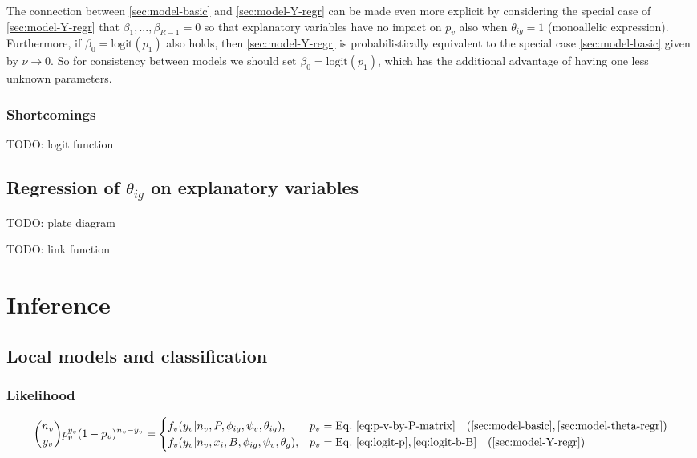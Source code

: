 \documentclass[letterpaper]{article}
\begin{document}
The connection between \ref{sec:model-basic} and \ref{sec:model-Y-regr} can be
made even more explicit by considering the special case of
\ref{sec:model-Y-regr} that \(\beta_1,...,\beta_{R-1}=0\) so that explanatory
variables have no impact on \(p_v\) also when \(\theta_{ig}=1\) (monoallelic
expression).  Furthermore, if \(\beta_0=\mathrm{logit}(p_1)\) also holds, then
\ref{sec:model-Y-regr} is probabilistically equivalent to the special case
\ref{sec:model-basic} given by \(\nu\rightarrow 0\).  So for consistency
between models we should set \(\beta_0=\mathrm{logit}(p_1)\), which has the
additional advantage of having one less unknown parameters.

\subsubsection{Shortcomings}

TODO: logit function

\subsection{Regression of \(\theta_{ig}\) on explanatory variables }
\label{sec:model-theta-regr}

TODO: plate diagram

TODO: link function

\renewcommand{\thesubsection}{\arabic{section}.\arabic{subsection}}
\section{Inference}
\label{sec:likelihood}

\subsection{Local models and classification}

\subsubsection{Likelihood}

\begin{equation}
\label{eq:f-v-M1-M3}
\binom{n_v}{y_v} p_v^{y_v} (1-p_v)^{n_v-y_v}
=
\begin{cases}
f_v(y_v | n_v, P, \phi_{ig}, \psi_v, \theta_{ig}), & p_v =
\mathrm{Eq.~}\ref{eq:p-v-by-P-matrix}
\quad (\ref{sec:model-basic}, \ref{sec:model-theta-regr}) \\
f_v(y_v | n_v, x_i, B, \phi_{ig}, \psi_v, \theta_{g}), & p_v =
\mathrm{Eq.~}\ref{eq:logit-p},\ref{eq:logit-b-B}
\quad (\ref{sec:model-Y-regr})
\end{cases}
\end{equation}
\end{document}
